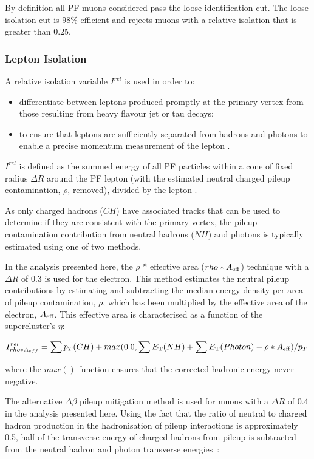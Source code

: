 By definition all PF muons considered pass the loose identification cut.
The loose isolation cut is 98\% efficient and rejects muons with a relative isolation that is greater than 0.25.

\subsubsection{Lepton Isolation}\label{subsubsec:relIso}
A relative isolation variable $I^{rel}$ is used in order to:
\begin{itemize}
\item differentiate between leptons produced promptly at the primary vertex from those resulting from heavy flavour jet or tau decays;
\item to ensure that leptons are sufficiently separated from hadrons and photons to enable a precise momentum measurement of the lepton .
\end{itemize}

$I^{rel}$ is defined as the summed energy of all PF particles within a cone of fixed radius $\Delta R$ around the PF lepton (with the estimated neutral charged pileup contamination, $\rho$, removed), divided by the lepton \pT.

As only charged hadrons ($CH$) have associated tracks that can be used to determine if they are consistent with the primary vertex, the pileup contamination contribution from neutral hadrons ($NH$) and photons is typically estimated using one of two methods.

In the analysis presented here,  the $\rho$ * effective area ($rho * A_{\rm eff}$) technique with a $\Delta R$ of 0.3 is used for the electron.
This method estimates the neutral pileup contributions by estimating and subtracting the median energy density per area of pileup contamination, $\rho$, which has been multiplied by the effective area of the electron, $A_{\rm eff}$.
This effective area is characterised as a function of the supercluster's $\eta$:

\begin{equation}
I^{rel}_{rho * A_{eff}} = \sum p_T(CH) + max (0.0, \sum E_{\rm T}(NH) + \sum E_{\rm T}(Photon) -\rho*A_{\rm eff} )/p_T \;
\end{equation}\label{eq:rhoEffA}

where the $max()$ function ensures that the corrected hadronic energy never negative.

The alternative $\Delta\beta$ pileup mitigation method is used for muons with a $\Delta R$ of 0.4 in the analysis presented here.
Using the fact that the ratio of neutral to charged hadron production in the hadronisation of pileup interactions is approximately 0.5, half of the transverse energy of charged hadrons from pileup is subtracted from the neutral hadron and photon transverse energies~\cite{Chatrchyan:2012vp}:

